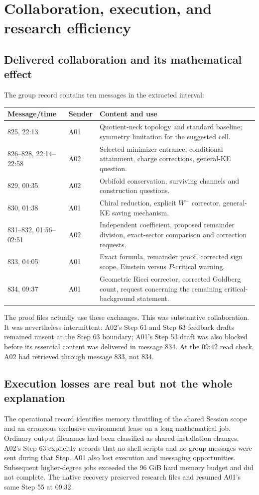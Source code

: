 \documentclass[11pt]{article}
\theoremstyle{remark}
\begin{document}
\section{Collaboration, execution, and research efficiency}

\subsection{Delivered collaboration and its mathematical effect}
The group record contains ten messages in the extracted interval:
\begin{center}\small
\begin{tabularx}{\textwidth}{@{}llX@{}}
\toprule Message/time & Sender & Content and use\\\midrule
825, 22:13 & A01 & Quotient-neck topology and standard baseline; symmetry
limitation for the suggested cell.\\
826--828, 22:14--22:58 & A02 & Selected-minimizer entrance, conditional
attainment, charge corrections, general-KE question.\\
829, 00:35 & A02 & Orbifold conservation, surviving channels and construction
questions.\\
830, 01:38 & A01 & Chiral reduction, explicit $W^-$ corrector, general-KE
saving mechanism.\\
831--832, 01:56--02:51 & A02 & Independent coefficient, proposed remainder
division, exact-sector comparison and correction requests.\\
833, 04:05 & A01 & Exact formula, remainder proof, corrected sign scope,
Einstein versus $P$-critical warning.\\
834, 09:37 & A01 & Geometric Ricci corrector, corrected Goldberg count,
request concerning the remaining critical-background statement.\\
\bottomrule
\end{tabularx}
\end{center}
The proof files actually use these exchanges. This was substantive
collaboration. It was nevertheless intermittent: A02's Step 61 and Step 63
feedback drafts remained unsent at the Step 63 boundary; A01's Step 53 draft
was also blocked before its essential content was delivered in message 834.
At the 09:42 read check, A02 had retrieved through message 833, not 834.

\subsection{Execution losses are real but not the whole explanation}
The operational record identifies memory throttling of the shared Session
scope and an erroneous exclusive environment lease on a long mathematical
job. Ordinary output filenames had been classified as shared-installation
changes. A02's Step 63 explicitly records that no shell scripts and no group
messages were sent during that Step. A01 also lost execution and messaging
opportunities. Subsequent higher-degree jobs exceeded the 96 GiB hard memory
budget and did not complete. The native recovery preserved research files
and resumed A01's same Step 55 at 09:32.
\end{document}
